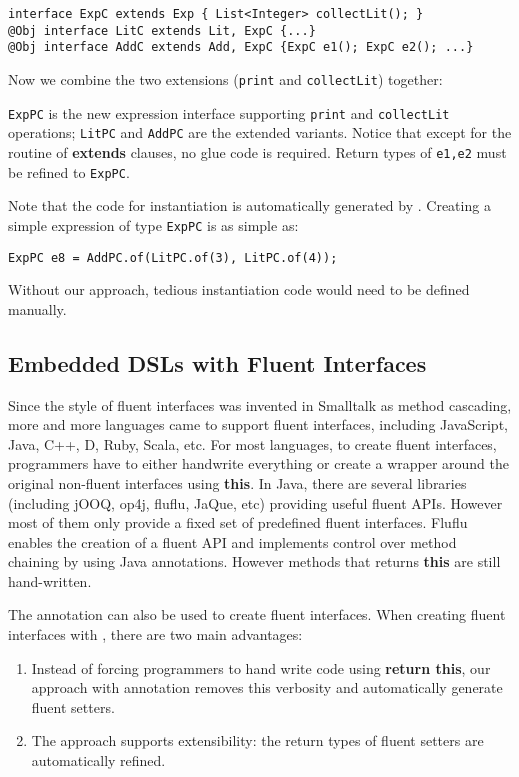 \begin{lstlisting}[]
interface ExpC extends Exp { List<Integer> collectLit(); }
@Obj interface LitC extends Lit, ExpC {...}
@Obj interface AddC extends Add, ExpC {ExpC e1(); ExpC e2(); ...}
\end{lstlisting}

\noindent Now we combine the two extensions (\texttt{print} and
\texttt{collectLit}) together:



\noindent \texttt{ExpPC} is the new expression interface supporting
\texttt{print} and \texttt{collectLit} operations; \texttt{LitPC} and
\texttt{AddPC} are the extended variants. Notice that except for the routine of
\textbf{extends} clauses, no glue code is required. Return types of
\texttt{e1,e2} must be refined to \texttt{ExpPC}.

Note that the code for instantiation is automatically generated by \mixin. 
Creating a simple expression of type \texttt{ExpPC} is 
as simple as:
\begin{lstlisting}
ExpPC e8 = AddPC.of(LitPC.of(3), LitPC.of(4));
\end{lstlisting}
\noindent Without our approach, tedious instantiation code would need 
to be defined manually. 

\subsection{Embedded DSLs with Fluent Interfaces}\label{sec:dsls}
Since the style of fluent interfaces was invented in Smalltalk as method
cascading, more and more languages came to support fluent interfaces, including
JavaScript, Java, C++, D, Ruby, Scala, etc. For most languages, to create fluent
interfaces, programmers have to either handwrite everything or create a wrapper
around the original non-fluent interfaces using \textbf{this}. In Java, there
are several libraries (including jOOQ, op4j, fluflu, JaQue, etc) providing useful
fluent APIs. However most of them only provide a fixed set of predefined fluent
interfaces. Fluflu enables the creation of a fluent API and implements control
over method chaining by using Java annotations. However methods that returns
\textbf{this} are still hand-written.

The \mixin annotation can also be used to create fluent interfaces.  When
creating fluent interfaces with \mixin, there are two main advantages:
\begin{enumerate}
\item Instead of forcing programmers to hand write code using \textbf{return
    this}, our approach with \mixin annotation removes this verbosity and
  automatically generate fluent setters.
\item The approach supports extensibility: the return types of fluent setters are
  automatically refined.
\end{enumerate} 

